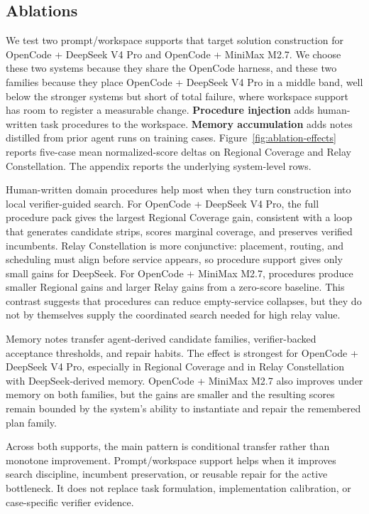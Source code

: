 \documentclass[11pt]{article}
\begin{document}
\subsection{Ablations}
\label{sec:ablations}

We test two prompt/workspace supports that target solution construction for OpenCode + DeepSeek V4 Pro and OpenCode + MiniMax M2.7. We choose these two systems because they share the OpenCode harness, and these two families because they place OpenCode + DeepSeek V4 Pro in a middle band, well below the stronger systems but short of total failure, where workspace support has room to register a measurable change. \textbf{Procedure injection} adds human-written task procedures to the workspace. \textbf{Memory accumulation} adds notes distilled from prior agent runs on training cases. Figure~\ref{fig:ablation-effects} reports five-case mean normalized-score deltas on Regional Coverage and Relay Constellation. The appendix reports the underlying system-level rows.

Human-written domain procedures help most when they turn construction into local verifier-guided search. For OpenCode + DeepSeek V4 Pro, the full procedure pack gives the largest Regional Coverage gain, consistent with a loop that generates candidate strips, scores marginal coverage, and preserves verified incumbents. Relay Constellation is more conjunctive: placement, routing, and scheduling must align before service appears, so procedure support gives only small gains for DeepSeek. For OpenCode + MiniMax M2.7, procedures produce smaller Regional gains and larger Relay gains from a zero-score baseline. This contrast suggests that procedures can reduce empty-service collapses, but they do not by themselves supply the coordinated search needed for high relay value.

Memory notes transfer agent-derived candidate families, verifier-backed acceptance thresholds, and repair habits. The effect is strongest for OpenCode + DeepSeek V4 Pro, especially in Regional Coverage and in Relay Constellation with DeepSeek-derived memory. OpenCode + MiniMax M2.7 also improves under memory on both families, but the gains are smaller and the resulting scores remain bounded by the system's ability to instantiate and repair the remembered plan family.

Across both supports, the main pattern is conditional transfer rather than monotone improvement. Prompt/workspace support helps when it improves search discipline, incumbent preservation, or reusable repair for the active bottleneck. It does not replace task formulation, implementation calibration, or case-specific verifier evidence.
\end{document}
